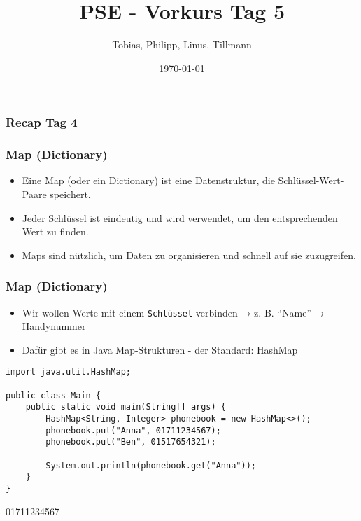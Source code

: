 \documentclass{../../presentation}
\title{PSE - Vorkurs Tag 5}
\author{Tobias, Philipp, Linus, Tillmann}
\institute{FIUS - Fachgruppe Informatik Universität Stuttgart}
\date{\today}
\begin{document}
\begin{frame}
	\titlepage
\end{frame}

\begin{frame}
	\listoftodos
\end{frame}

\begin{frame}
	\frametitle{Recap Tag 4}
\end{frame}

\begin{frame}[fragile]
	\frametitle{Map (Dictionary)}
	\begin{itemize}
		\item Eine Map (oder ein Dictionary) ist eine Datenstruktur, die Schlüssel-Wert-Paare speichert.
		\item Jeder Schlüssel ist eindeutig und wird verwendet, um den entsprechenden Wert zu finden.
		\item Maps sind nützlich, um Daten zu organisieren und schnell auf sie zuzugreifen.
	\end{itemize}
\end{frame}

\begin{frame}[fragile]
	\frametitle{Map (Dictionary)}
	\begin{itemize}
		\item Wir wollen Werte mit einem \texttt{Schlüssel} verbinden → z. B. “Name” → Handynummer
		\item Dafür gibt es in Java Map-Strukturen - der Standard: HashMap
	\end{itemize}
	\begin{verbatim}
import java.util.HashMap;

public class Main {
    public static void main(String[] args) {
        HashMap<String, Integer> phonebook = new HashMap<>();
        phonebook.put("Anna", 01711234567);
        phonebook.put("Ben", 01517654321);

        System.out.println(phonebook.get("Anna"));
    }
}
\end{verbatim}
	\begin{ausgabe}
		01711234567
	\end{ausgabe}
\end{frame}

\end{document}
